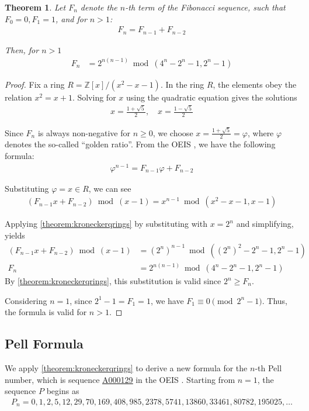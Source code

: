 \documentclass[12pt,reqno]{article}
\theoremstyle{plain}
\newtheorem{theorem}{Theorem}
\theoremstyle{definition}
\newcommand{\seqnum}[1]{\href{https://oeis.org/#1}{\rm \underline{#1}}}
\begin{document}
\begin{theorem} \label{theorem:fibonacci}
Let $F_n$ denote the $n$-th term of the Fibonacci sequence, such that $F_0 = 0, F_1 = 1$, and for $n > 1$:
\begin{align*}
    F_n = F_{n-1} + F_{n-2}
\end{align*}

Then, for $n > 1$
\begin{align*}
F_n &= 2^{n (n - 1)} \bmod{(4^n-2^n-1, 2^n-1)}
\end{align*}
\end{theorem}
\begin{proof}
Fix a ring $R = \mathbb{Z}[x]/(x^2 - x - 1)$. In the ring $R$, the elements obey the relation $x^2 = x + 1$. Solving for $x$ using the quadratic equation gives the solutions
\begin{align*}
    x = \frac{1 + \sqrt{5}}{2}, \quad x = \frac{1 - \sqrt{5}}{2}
\end{align*}

Since $F_n$ is always non-negative for $n \geq 0$, we choose $x = \frac{1 + \sqrt{5}}{2} = \varphi$, where $\varphi$ denotes the so-called ``golden ratio''. From the OEIS \cite{A000045}, we have the following formula:
\begin{align*}
    \varphi^{n-1} = F_{n-1} \varphi + F_{n-2}
\end{align*}

Substituting $\varphi = x \in R$, we can see
\begin{align*}
    (F_{n-1} x + F_{n-2}) \bmod{(x-1)} = x^{n-1} \bmod{(x^2 - x - 1, x-1)}
\end{align*}

Applying \cref{theorem:kroneckerqrings} by substituting with $x = 2^n$ and simplifying, yields
\begin{align*}
    (F_{n-1} x + F_{n-2}) \bmod{(x-1)} &= (2^n)^{n-1} \bmod{((2^n)^2 - 2^n - 1, 2^n-1)} \\
    F_n &= 2^{n (n - 1)} \bmod{(4^n - 2^n - 1, 2^n-1)}
\end{align*}
By \cref{theorem:kroneckerqrings}, this substitution is valid since $2^n \geq F_n$.

Considering $n = 1$, since $2^1-1 = F_1 = 1$, we have $F_1 \equiv 0 \pmod{2^n - 1}$. Thus, the formula is valid for $n > 1$.
\end{proof}

\subsection{Pell Formula}
We apply \cref{theorem:kroneckerqrings} to derive a new formula for the $n$-th Pell number, which is sequence \seqnum{A000129} in the OEIS \cite{A000129}. Starting from $n=1$, the sequence $P$ begins as
\begin{align*}
    P_n = 0, 1, 2, 5, 12, 29, 70, 169, 408, 985, 2378, 5741, 13860, 33461, 80782, 195025, \ldots
\end{align*}
\end{document}

